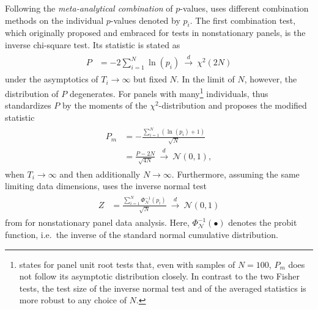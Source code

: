 Following the \textit{meta-analytical combination} of $p$-values, \citet{Choi2001} uses different combination methods on the individual $p$-values denoted by $ p_i $. The first combination test, which \citet{Fisher1932} originally proposed and \citet{MaddalaWu1999} embraced for tests in nonstationary panels, is the inverse chi-square test. Its statistic is stated as
\begin{align} \label{eq:Choi_P}
\begin{split}
	P & = - 2 \sum_{i=1}^{N} \ln\left( p_i \right) \ \overset{d}{\longrightarrow} \ \mathcal{\chi}^2(2N)  %
\end{split}
\end{align}
under the asymptotics of $ T_i \to \infty $ but fixed $ N $. In the limit of $ N $, however, the distribution of $ P $ degenerates. For panels with many\footnote{\citet[p.~268]{Choi2001} states for panel unit root tests that, even with samples of $N=100$, $P_m$ does not follow its asymptotic distribution closely. In contrast to the two Fisher tests, the test size of the inverse normal test and of the averaged statistics is more robust to any choice of $ N $.} individuals, \citet{Choi2001} thus standardizes $ P $ by the moments of the $ \chi^2 $-distribution and proposes the modified statistic
\begin{align} \label{eq:Choi_Pm}
\begin{split}
	P_m & = - \frac{ \sum_{i=1}^{N} \left( \ln\left( p_i \right) + 1 \right) }{\sqrt{N}} \\ 
	& = \frac{P - 2N}{\sqrt{4N}} \ \overset{d}{\longrightarrow} \ \mathcal{N}(0,1), %
\end{split}
\end{align}
when $ T_i \to \infty $ and then additionally $ N \to \infty $. Furthermore, assuming the same limiting data dimensions, \citet{Choi2001} uses the inverse normal test
\begin{align} \label{eq:Choi_Z}
\begin{split}
	Z & = \frac{ \sum_{i=1}^{N} \Phi_{\mathcal{N}}^{-1} \left( p_i \right) }{\sqrt{N}} \ \overset{d}{\longrightarrow} \ \mathcal{N}(0,1) %
\end{split}
\end{align}
from \citet{StoufferEtAl1949} for nonstationary panel data analysis. Here, $\Phi_{\mathcal{N}}^{-1} \left( \bullet \right) $ denotes the probit function, i.e.~the inverse of the standard normal cumulative distribution.


